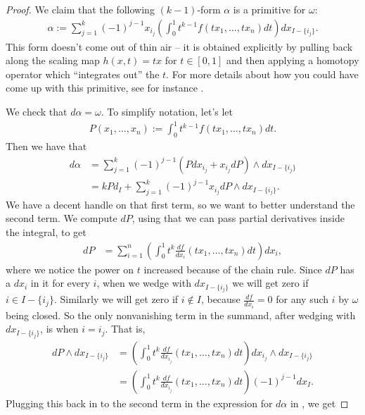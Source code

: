 \documentclass[11pt]{book}
\begin{document}
\begin{proof}
We claim that the following $(k-1)$-form $\alpha$ is a primitive for $\omega$:
\begin{align*}
    \alpha := \sum_{j=1}^k (-1)^{j-1} x_{i_j} \left( \int_0^1 t^{k-1} f(tx_1, \ldots, tx_n) dt \right) dx_{I\minus\{i_j\}}.
\end{align*}
This form doesn't come out of thin air -- it is obtained explicitly by pulling back along the scaling map $h(x,t) = tx$ for $t\in [0,1]$ and then applying a homotopy operator which ``integrates out'' the $t$. For more details about how you could have come up with this primitive, see for instance \cite[I\S4]{BottTu}.

We check that $d\alpha = \omega$. To simplify notation, let's let
\begin{align*}
    P(x_1, \ldots, x_n) := \int_0^1 t^{k-1} f(tx_1, \ldots, tx_n) dt.
\end{align*}
Then we have that
\begin{equation}\label{eqn:dalpha-1}
\begin{aligned}
    d\alpha &= \sum_{j=1}^k (-1)^{j-1} (P dx_{i_j} + x_{i_j} dP) \wedge dx_{I\minus\{i_j\}} \\
    &= kPd_I + \sum_{j=1}^k (-1)^{j-1}x_{i_j} dP\wedge dx_{I\minus\{i_j\}}.
\end{aligned}
\end{equation}
We have a decent handle on that first term, so we want to better understand the second term. We compute $dP$, using that we can pass partial derivatives inside the integral, to get
\begin{align*}
    dP &= \sum_{i=1}^n \left(\int_0^1 t^{k} \frac{df}{dx_i}(tx_1, \ldots, tx_n) dt\right)dx_i,
\end{align*}
where we notice the power on $t$ increased because of the chain rule. Since $dP$ has a $dx_i$ in it for every $i$, when we wedge with $dx_{I\minus\{i_j\}}$ we will get zero if $i \in I\minus\{i_j\}$. Similarly we will get zero if $i\notin I$, because $\frac{df}{dx_i} = 0$ for any such $i$ by $\omega$ being closed. So the only nonvanishing term in the summand, after wedging with $dx_{I\minus\{i_j\}}$, is when $i = i_j$. That is,
\begin{align*}
    dP \wedge dx_{I\minus\{i_j\}} &= \left(\int_0^1 t^k \frac{df}{dx_{i_j}}(tx_1, \ldots, tx_n) dt\right) dx_{i_j}\wedge dx_{I\minus\{i_j\}} \\
    &= \left(\int_0^1 t^k\frac{df}{dx_{i_j}}(tx_1, \ldots, tx_n)dt\right) (-1)^{j-1} dx_I.
\end{align*}
Plugging this back in to the second term in the expression for $d\alpha$ in , we get

\end{proof}
\end{document}
